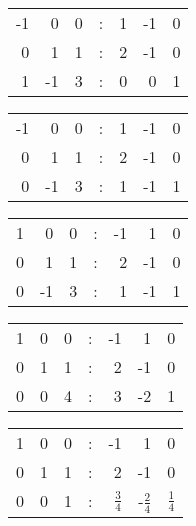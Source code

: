 \documentclass[11pt]{article}
\begin{document}
\begin{center}
\begin{tabular}{rrrlrrr}
 -1  &   0  &  0  &  :  &  1  &  -1  &  0  \\
  0  &   1  &  1  &  :  &  2  &  -1  &  0  \\
  1  &  -1  &  3  &  :  &  0  &   0  &  1  \\
\end{tabular}
\end{center}





\begin{center}
\begin{tabular}{rrrlrrr}
 -1  &   0  &  0  &  :  &  1  &  -1  &  0  \\
  0  &   1  &  1  &  :  &  2  &  -1  &  0  \\
  0  &  -1  &  3  &  :  &  1  &  -1  &  1  \\
\end{tabular}
\end{center}





\begin{center}
\begin{tabular}{rrrlrrr}
 1  &   0  &  0  &  :  &  -1  &   1  &  0  \\
 0  &   1  &  1  &  :  &   2  &  -1  &  0  \\
 0  &  -1  &  3  &  :  &   1  &  -1  &  1  \\
\end{tabular}
\end{center}





\begin{center}
\begin{tabular}{rrrlrrr}
 1  &  0  &  0  &  :  &  -1  &   1  &  0  \\
 0  &  1  &  1  &  :  &   2  &  -1  &  0  \\
 0  &  0  &  4  &  :  &   3  &  -2  &  1  \\
\end{tabular}
\end{center}





\begin{center}
\begin{tabular}{rrrlrrr}
 1  &  0  &  0  &  :  &                 -1  &                   1  &                  0  \\
 0  &  1  &  1  &  :  &                  2  &                  -1  &                  0  \\
 0  &  0  &  1  &  :  &  \( \frac{3}{4} \)  &  -\( \frac{2}{4} \)  &  \( \frac{1}{4} \)  \\
\end{tabular}
\end{center}
\end{document}
